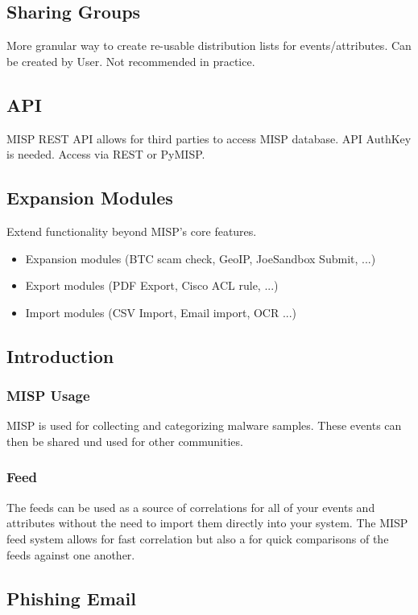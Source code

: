 \subsection{Sharing Groups}
More granular way to create re-usable distribution lists for events/attributes. Can be created by User. Not recommended in practice.

\subsection{API}
MISP REST API allows for third parties to access MISP database. API AuthKey is needed. Access via REST or PyMISP.
\subsection{Expansion Modules}
Extend functionality beyond MISP’s core features. 

\begin{itemize}
    \item Expansion modules (BTC scam check, GeoIP, JoeSandbox Submit, ...)
    \item Export modules (PDF Export, Cisco ACL rule, ...)
    \item Import modules (CSV Import, Email import, OCR ...)
\end{itemize}

\subsection{Introduction}

\subsubsection{MISP Usage}
MISP is used for collecting and categorizing malware samples. These events can then be shared und used for other communities.

\subsubsection{Feed}
The feeds can be used as a source of correlations for all of your events and attributes without the need to import them directly into your system. The MISP feed system allows for fast correlation but also a for quick comparisons of the feeds against one another.

\subsection{Phishing Email}


